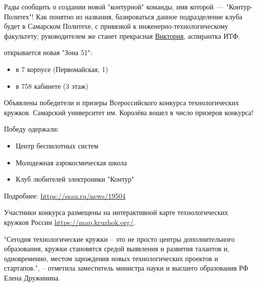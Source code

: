\secdown


Рады сообщить о создании новой "контурной" команды, имя которой\ ---
"Контур-Политех"! Как понятно из названия, базироваться данное подразделение
клуба будет в Самарском Политехе, с привязкой к инженерно-технологическому
факультету; руководителем же станет прекрасная
\href{https://vk.com/kkkshch}{Виктория}, аспирантка ИТФ.

\bigskip\noindent
открывается новая "Зона 51":
\begin{itemize}[nosep]
\item в 7 корпусе (Первомайская, 1)
\item в 758 кабинете (3 этаж)
\end{itemize}

\bigskip
\noindent{}

\clearpage
{}

Объявлены победители и призеры Всероссийского конкурса технологических кружков.
Самарский университет им. Королёва вошел в число призеров конкурса!

\bigskip\noindent
Победу одержали:
\begin{itemize}[nosep]
\item Центр беспилотных систем
\item Молодежная аэрокосмическая школа
\item Клуб любителей электроники "Контур"
\end{itemize}

\bigskip\noindent
Подробнее: \url{https://ssau.ru/news/19504}

\bigskip\noindent
Участники конкурса
размещены на интерактивной карте технологических кружков России
\url{https://map.kruzhok.org/}.

\clearpage\noindent
"Сегодня технологические кружки – это не просто центры дополнительного
образования, кружки становятся средой выявления и развития талантов и,
одновременно, местом зарождения новых технологических проектов и стартапов.", –
отметила заместитель министра науки и высшего образования РФ Елена Дружинина.



\secup
